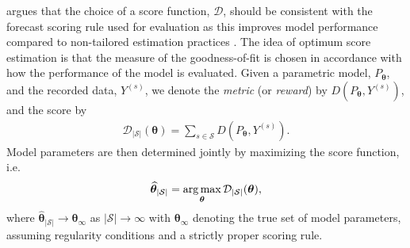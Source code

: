 \citet{Gneiting2007} argues that the choice of a score function, $\mathcal{D}$, should be consistent with the forecast scoring rule used for evaluation as this improves model performance compared to non-tailored estimation practices \citep{friedman1983a,Copas1983}. 
The idea of optimum score estimation is that the measure of the goodness-of-fit is chosen in accordance with how the performance of the model is evaluated. 
Given a parametric model, $P_{\bm{\theta}}$, and the recorded data, $Y^{(s)}$, we denote the \textit{metric} (or \textit{reward}) by $D(P_{\bm{\theta}}, Y^{(s)})$, and the score by
\begin{align}
    \mathcal{D}_{|\mathcal{S}|}(\bm{\theta}) = \sum_{s \in \mathcal{S}} D\left(P_{\bm{\theta}}, Y^{(s)}\right). %
    \label{eq:mean_score}
\end{align}
Model parameters are then determined jointly by maximizing the score function, i.e.
$$\widehat{\bm{\theta}}_{|\mathcal{S}|} = \operatorname*{arg\,max}_{\bm{\theta}}\mathcal{D}_{|\mathcal{S}|}(\bm{\theta}), $$
where $\widehat{\bm{\theta}}_{|\mathcal{S}|}  \rightarrow \bm{\theta}_{\infty}$ as $|\mathcal{S}| \rightarrow \infty$ with $\bm{\theta}_{\infty}$ denoting the true set of model parameters, assuming regularity conditions and a strictly proper scoring rule.


